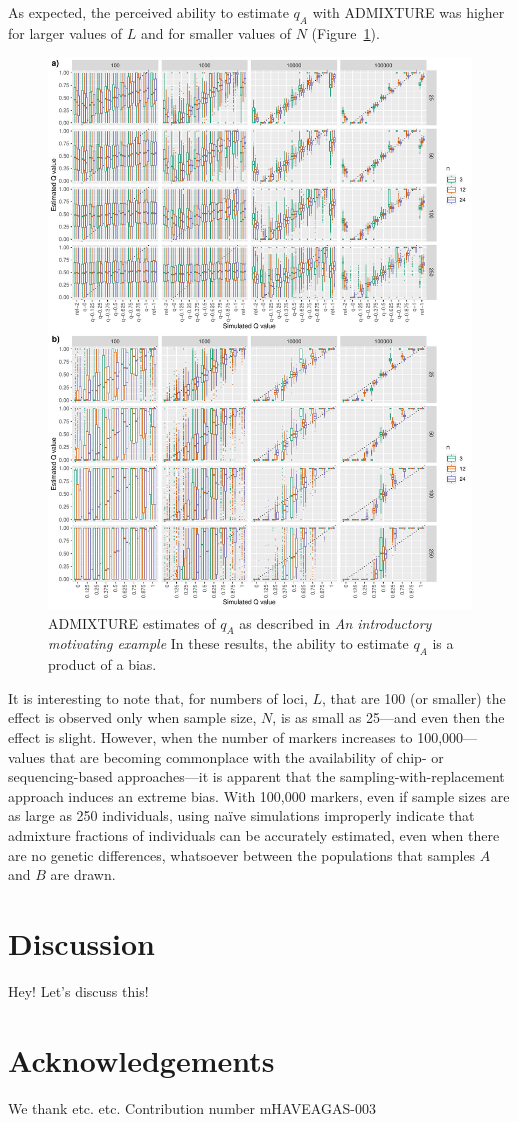 As expected, the perceived ability to estimate $q_A$ with ADMIXTURE was higher
for larger values of $L$ and for smaller values of $N$ (Figure~\ref{fig:bias-sims}).
\begin{figure}
\includegraphics[width=\textwidth]{figures/bias-sims-unsup-and-sup.pdf}
\caption{ADMIXTURE estimates of $q_A$ as described in
{\em An introductory motivating example} In these results, the ability to estimate $q_A$
is a product of a bias.
}
\label{fig:bias-sims}
\end{figure}
It is interesting to note
that, for numbers of loci,  $L$, that are 100 (or smaller) the effect is observed only when
sample size, $N$, is as small as 25---and even then the effect is slight.  However, when the
number of markers increases to 100,000---values that are becoming commonplace with the availability of chip-
or sequencing-based approaches---it is apparent that the sampling-with-replacement approach
induces an extreme bias.  With 100,000 markers, even if sample sizes are as large as 250 individuals,
using na\"{i}ve simulations improperly indicate that admixture fractions of individuals can be
accurately estimated, even when there are no genetic differences, whatsoever between the populations that
samples $A$ and $B$ are drawn.



\section*{Discussion}
Hey! Let's discuss this!



\section*{Acknowledgements}
We thank etc. etc.   Contribution number  mHAVEAGAS-003
